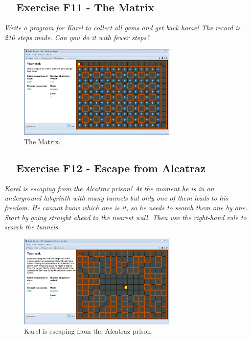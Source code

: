 \documentclass[article,A4,12pt]{llncs}
\begin{document}
{{{{\newpage

\subsection{\ \ Exercise F11 - The Matrix}

{\em Write a program for Karel to collect all gems and get back home! The record is 
210 steps made. Can you do it with fewer steps?}

\begin{figure}[!ht]
\begin{center}
\includegraphics[width=0.7\textwidth]{img/g06.png}
\end{center}
\vspace{-4mm}
\caption{The Matrix.}
\label{fig:g06}
\vspace{-10mm}
\end{figure}
\noindent

\subsection{\ \ Exercise F12 - Escape from Alcatraz}

{\em Karel is escaping from the Alcatraz prison! At the moment he is in an underground labyrinth with many tunnels but only one of them leads to his freedom. He cannot know which one is it, so he needs to search them one by one. Start by going straight ahead to the nearest wall. Then use the right-hand rule to search the tunnels.}

\newpage

\begin{figure}[!ht]
\begin{center}
\includegraphics[width=0.7\textwidth]{img/g07.png}
\end{center}
\vspace{-4mm}
\caption{Karel is escaping from the Alcatraz prison.}
\label{fig:g07}
\vspace{-8mm}
\end{figure}
\noindent

}}}}
\end{document}
